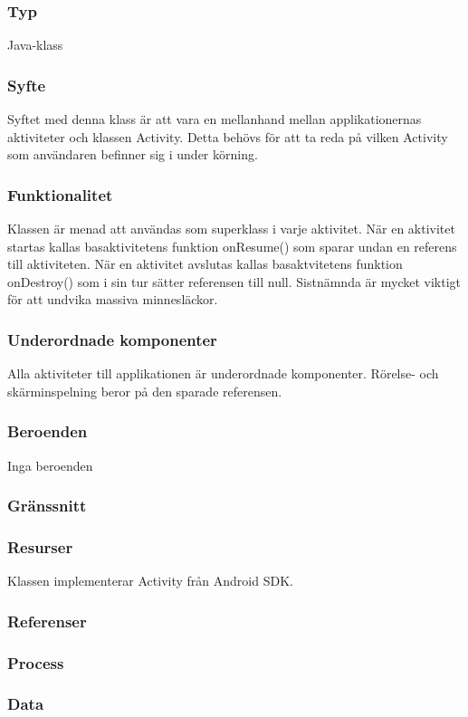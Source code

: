 \subsubsection{Typ}
Java-klass
\subsubsection{Syfte}
Syftet med denna klass är att vara en mellanhand mellan applikationernas aktiviteter och klassen Activity. Detta behövs för att ta reda på vilken Activity som användaren befinner sig i under körning.
\subsubsection{Funktionalitet}
Klassen är menad att användas som superklass i varje aktivitet. När en aktivitet startas kallas basaktivitetens funktion onResume() som sparar undan en referens till aktiviteten. När en aktivitet avslutas kallas basaktvitetens funktion onDestroy() som i sin tur sätter referensen till null. Sistnämnda är mycket viktigt för att undvika massiva minnesläckor.
\subsubsection{Underordnade komponenter}
Alla aktiviteter till applikationen är underordnade komponenter. Rörelse- och skärminspelning beror på den sparade referensen.
\subsubsection{Beroenden}
Inga beroenden
\subsubsection{Gränssnitt}

\subsubsection{Resurser}
Klassen implementerar Activity från Android SDK.
\subsubsection{Referenser}

\subsubsection{Process}

\subsubsection{Data}
 